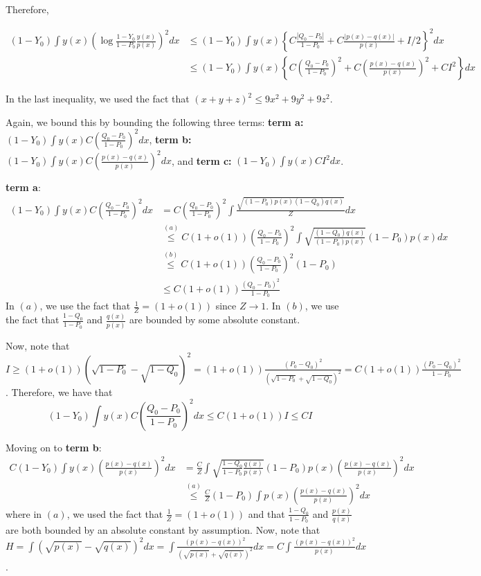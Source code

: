 \documentclass{article}
\begin{document}
Therefore,

\begin{align*}
(1 - Y_0) \int y(x) \left( \log \frac{1 - Y_0}{1 - P_0} \frac{y(x)}{p(x)} \right)^2 dx &\leq 
   (1 - Y_0) \int y(x) \left\{ C \frac{| Q_0 - P_0|}{1 - P_0} + C \frac{ | p(x) - q(x)|}{p(x)} + I/2 \right\}^2 dx \\
  &\leq (1 - Y_0) \int y(x) \left\{ C\left( \frac{Q_0 - P_0}{1 - P_0} \right)^2 + 
                     C \left( \frac{p(x) - q(x)}{p(x)} \right)^2 + C I^2 \right\} dx 
\end{align*}

In the last inequality, we used the fact that $(x + y + z)^2 \leq 9x^2 + 9y^2 + 9z^2$. 

Again, we bound this by bounding the following three terms: \textbf{term a:} $(1 - Y_0) \int y(x) C \left( \frac{Q_0 - P_0}{1 - P_0} \right)^2 dx$, \textbf{term b:} $(1 - Y_0) \int y(x) C  \left( \frac{ p(x) - q(x)}{p(x)} \right)^2 dx$, and \textbf{term c:} $(1 - Y_0) \int y(x) C I^2  dx$.

\textbf{term a}:
\begin{align*}
(1 - Y_0) \int y(x) C \left( \frac{Q_0 - P_0}{1 - P_0} \right)^2 dx &= 
              C \left( \frac{Q_0 - P_0}{1 - P_0} \right)^2 \int \frac{\sqrt{(1-P_0)p(x) (1-Q_0)q(x)}}{Z} dx \\
   &\stackrel{(a)} \leq C (1+o(1)) \left( \frac{Q_0 - P_0}{1 - P_0} \right)^2 \int \sqrt{\frac{ (1-Q_0 )q(x)}{(1-P_0) p(x)} } (1 - P_0) p(x) dx \\ 
   &\stackrel{(b)} \leq C (1+o(1)) \left( \frac{Q_0 - P_0}{1 - P_0} \right)^2 (1 - P_0) \\
   &\leq C (1 + o(1)) \frac{ (Q_0 - P_0)^2}{1 - P_0} 
\end{align*}
In $(a)$, we use the fact that $\frac{1}{Z} = (1 + o(1))$ since $Z \rightarrow 1$. In $(b)$, we use the fact that $\frac{1-Q_0}{1-P_0}$ and $\frac{q(x)}{p(x)}$ are bounded by some absolute constant. 

Now, note that $I \geq (1+o(1)) (\sqrt{1 - P_0} - \sqrt{1- Q_0})^2 =  (1+o(1)) \frac{ (P_0 - Q_0)^2}{(\sqrt{1 - P_0} + \sqrt{1 - Q_0})^2} = C (1 + o(1)) \frac{ (P_0 - Q_0)^2}{1 - P_0}$. Therefore, we have that 
\[
(1 - Y_0) \int y(x) C \left( \frac{Q_0 - P_0}{1 - P_0} \right)^2 dx \leq C ( 1 + o(1)) I \leq C I 
\]


Moving on to \textbf{term b}:
\begin{align*}
C (1 - Y_0) \int y(x) \left( \frac{ p(x) - q(x)}{p(x)} \right)^2 dx &= 
         \frac{C}{Z} \int \sqrt{ \frac{1 - Q_0}{1 - P_0} \frac{q(x)}{p(x)} } (1 - P_0) p(x) 
                 \left( \frac{p(x) - q(x)}{p(x)} \right)^2 dx  \\
   &\stackrel{(a)} \leq \frac{C}{Z} (1 - P_0) \int p(x) \left( \frac{p(x) - q(x)}{p(x)} \right)^2 dx 
\end{align*}
where in $(a)$, we used the fact that $\frac{1}{Z} = (1 + o(1))$ and that $\frac{1- Q_0}{1-P_0}$ and $\frac{p(x)}{q(x)}$ are both bounded by an absolute constant by assumption. 
Now, note that $H = \int (\sqrt{p(x)} - \sqrt{q(x)})^2 dx 
= \int \frac{ (p(x) - q(x))^2 }{(\sqrt{p(x)} + \sqrt{q(x)})^2 } dx = C \int \frac{(p(x) - q(x))^2}{p(x)} dx $. 
\end{document}
